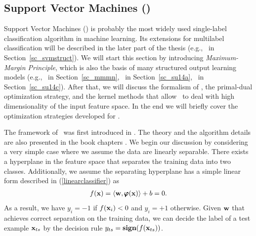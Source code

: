 {\iffalse
The key is to introduce a set of tighter upper bounds on (\ref{lr_posteriori_log}) that are parameterized by $\valpha$.
The bounds should have a simple form such that the maximizing (\ref{lr_posteriori_log}) over $\vw$ can be solved analytically with $\alpha$.
The solution to the original problem is transferred as finding the tighter upper bounds for  $\vw$, which is to minimize with respect to $\alpha$.

Later on, optimization algorithms that are based on dual form have been developed, for example iterative optimization method \citep{Keerthi05a} and the dual coordinate descent method \citep{Yu11dual}.
\fi


%
% 
\subsection{Support Vector Machines (\svm)}	\label{sc_svm}

Support Vector Machines (\svm) is probably the most widely used single-label classification algorithm in machine learning.
Its extensions for multilabel classification will be described in the later part of the thesis (e.g., \svmstruct\ in Section~\ref{sc_svmstruct}).
We will start this section by introducing \textit{Maximum-Margin Principle}, which is also the basis of many structured output learning models (e.g., \mmmn\ in Section~\ref{sc_mmmn}, \spin\ in Section~\ref{sc_su14a}, \rta\ in Section~\ref{sc_su14c}).
After that, we will discuss the formalism of \svm, the primal-dual optimization strategy, and the kernel methods that allow \svm\ to deal with high dimensionality of the input feature space.
In the end we will briefly cover the optimization strategies developed for \svm.

The framework of \svm\ was first introduced in \citep{Boser92,Cortes95support}.
The theory and the algorithm details are also presented in the book chapters \citep{Scholkopf02learning,taylor04,Bishop07}.
We begin our discussion by considering a very simple case where we assume the data are linearly separable.
There exists a hyperplane in the feature space that separates the training data into two classes.
Additionally, we assume the {separating hyperplane} has a simple linear form described in (\ref{linearclassifier}) as
\begin{align*}
	f(\mathbf {x})=\langle \mathbf {w}, \pmb \varphi(\mathbf {x}) \rangle + b = 0.
\end{align*}
As a result, we have $y_i=-1$ if $f(\mathbf {x}_i)<0$ and $y_i=+1$ otherwise.
Given $\vw$ that achieves correct separation on the training data, we can decide the label of a test example $\mathbf {x}_{ts}$ by the decision rule $y_{ts}=\textbf{sign}(f(\mathbf {x}_{ts}))$.

}
